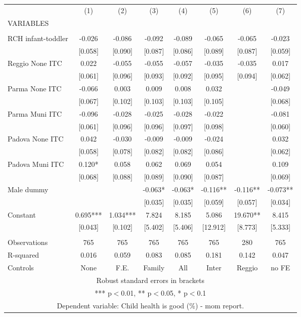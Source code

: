 \begin{tabular}{lccccccc} \hline
 & (1) & (2) & (3) & (4) & (5) & (6) & (7) \\
VARIABLES &  &  &  &  &  &  &  \\ \hline
 &  &  &  &  &  &  &  \\
RCH infant-toddler & -0.026 & -0.086 & -0.092 & -0.089 & -0.065 & -0.065 & -0.023 \\
 & [0.058] & [0.090] & [0.087] & [0.086] & [0.089] & [0.087] & [0.059] \\
Reggio None ITC & 0.022 & -0.055 & -0.055 & -0.057 & -0.035 & -0.035 & 0.017 \\
 & [0.061] & [0.096] & [0.093] & [0.092] & [0.095] & [0.094] & [0.062] \\
Parma None ITC & -0.066 & 0.003 & 0.009 & 0.008 & 0.032 &  & -0.049 \\
 & [0.067] & [0.102] & [0.103] & [0.103] & [0.105] &  & [0.068] \\
Parma Muni ITC & -0.096 & -0.028 & -0.025 & -0.028 & -0.022 &  & -0.081 \\
 & [0.061] & [0.096] & [0.096] & [0.097] & [0.098] &  & [0.060] \\
Padova None ITC & 0.042 & -0.030 & -0.009 & -0.009 & -0.024 &  & 0.032 \\
 & [0.058] & [0.078] & [0.082] & [0.082] & [0.086] &  & [0.062] \\
Padova Muni ITC & 0.120* & 0.058 & 0.062 & 0.069 & 0.054 &  & 0.109 \\
 & [0.068] & [0.088] & [0.089] & [0.090] & [0.087] &  & [0.069] \\
Male dummy &  &  & -0.063* & -0.063* & -0.116** & -0.116** & -0.073** \\
 &  &  & [0.035] & [0.035] & [0.059] & [0.057] & [0.034] \\
Constant & 0.695*** & 1.034*** & 7.824 & 8.185 & 5.086 & 19.670** & 8.415 \\
 & [0.043] & [0.102] & [5.402] & [5.406] & [12.912] & [8.773] & [5.333] \\
 &  &  &  &  &  &  &  \\
Observations & 765 & 765 & 765 & 765 & 765 & 280 & 765 \\
R-squared & 0.016 & 0.059 & 0.083 & 0.085 & 0.181 & 0.142 & 0.047 \\
 Controls & None & F.E. & Family & All & Inter & Reggio & no FE \\ \hline
\multicolumn{8}{c}{ Robust standard errors in brackets} \\
\multicolumn{8}{c}{ *** p$<$0.01, ** p$<$0.05, * p$<$0.1} \\
\multicolumn{8}{c}{ Dependent variable: Child health is good (\%) - mom report.} \\
\end{tabular}
